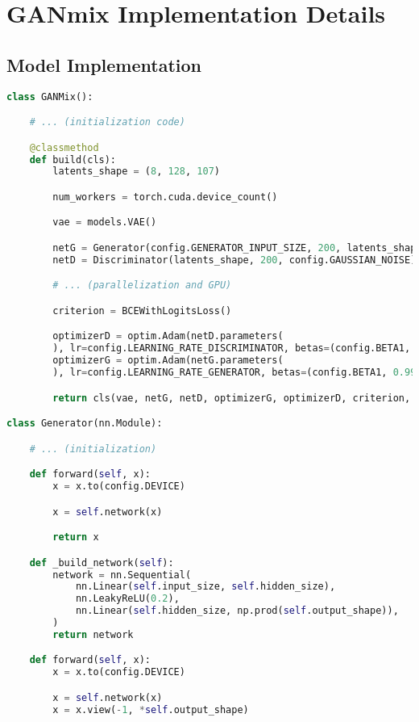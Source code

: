 \chapter{GANmix Implementation Details} \label{ann:ganmix-implementation}

\section{Model Implementation}

\begin{lstlisting}[language=Python, caption={Implementation of the GANmix model.}]
class GANMix():

    # ... (initialization code)

    @classmethod
    def build(cls):
        latents_shape = (8, 128, 107)

        num_workers = torch.cuda.device_count()

        vae = models.VAE()

        netG = Generator(config.GENERATOR_INPUT_SIZE, 200, latents_shape)
        netD = Discriminator(latents_shape, 200, config.GAUSSIAN_NOISE)

        # ... (parallelization and GPU)

        criterion = BCEWithLogitsLoss()

        optimizerD = optim.Adam(netD.parameters(
        ), lr=config.LEARNING_RATE_DISCRIMINATOR, betas=(config.BETA1, 0.999))
        optimizerG = optim.Adam(netG.parameters(
        ), lr=config.LEARNING_RATE_GENERATOR, betas=(config.BETA1, 0.999))

        return cls(vae, netG, netD, optimizerG, optimizerD, criterion, num_workers)

class Generator(nn.Module):

    # ... (initialization)

    def forward(self, x):
        x = x.to(config.DEVICE)

        x = self.network(x)

        return x

    def _build_network(self):
        network = nn.Sequential(
            nn.Linear(self.input_size, self.hidden_size),
            nn.LeakyReLU(0.2),
            nn.Linear(self.hidden_size, np.prod(self.output_shape)),
        )
        return network

    def forward(self, x):
        x = x.to(config.DEVICE)

        x = self.network(x)
        x = x.view(-1, *self.output_shape)


\end{lstlisting}
